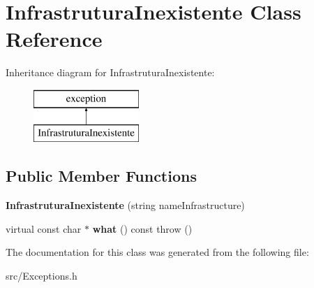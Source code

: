 \hypertarget{class_infrastrutura_inexistente}{}\section{Infrastrutura\+Inexistente Class Reference}
\label{class_infrastrutura_inexistente}
Inheritance diagram for Infrastrutura\+Inexistente\+:\begin{figure}[H]
\begin{center}
\leavevmode
\includegraphics[height=2.000000cm]{class_infrastrutura_inexistente}
\end{center}
\end{figure}
\subsection*{Public Member Functions}
\begin{DoxyCompactItemize}
\item 
\hypertarget{class_infrastrutura_inexistente_ac177b75a9173440c1d939f4af85f2596}{}{\bfseries Infrastrutura\+Inexistente} (string name\+Infrastructure)\label{class_infrastrutura_inexistente_ac177b75a9173440c1d939f4af85f2596}

\item 
\hypertarget{class_infrastrutura_inexistente_aea5656e77e715c0f5634d34adf909142}{}virtual const char $\ast$ {\bfseries what} () const   throw ()\label{class_infrastrutura_inexistente_aea5656e77e715c0f5634d34adf909142}

\end{DoxyCompactItemize}


The documentation for this class was generated from the following file\+:\begin{DoxyCompactItemize}
\item 
src/Exceptions.\+h\end{DoxyCompactItemize}
